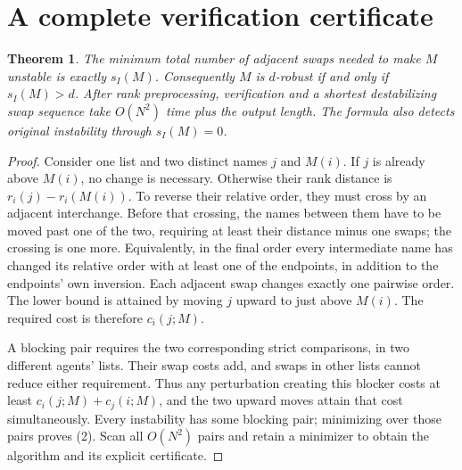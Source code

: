 \documentclass[11pt]{article}
\newtheorem{theorem}{Theorem}
\theoremstyle{definition}
\begin{document}
\section*{A complete verification certificate}
\begin{theorem}
The minimum total number of adjacent swaps needed to make $M$ unstable
is exactly $s_I(M)$. Consequently $M$ is $d$-robust if and only if
$s_I(M)>d$. After rank preprocessing, verification and a shortest
destabilizing swap sequence take $O(N^2)$ time plus the output length.
The formula also detects original instability through $s_I(M)=0$.
\end{theorem}
\begin{proof}
Consider one list and two distinct names $j$ and $M(i)$. If $j$ is already
above $M(i)$, no change is necessary. Otherwise their rank distance is
$r_i(j)-r_i(M(i))$. To reverse their relative order, they must cross by an
adjacent interchange. Before that crossing, the names between them have
to be moved past one of the two, requiring at least their distance minus
one swaps; the crossing is one more. Equivalently, in the final order
every intermediate name has changed its relative order with at least one
of the endpoints, in addition to the endpoints' own inversion. Each
adjacent swap changes exactly one pairwise order. The lower bound is
attained by moving $j$ upward to just above $M(i)$. The required cost is
therefore $c_i(j;M)$.

A blocking pair requires the two corresponding strict comparisons, in
two different agents' lists. Their swap costs add, and swaps in other
lists cannot reduce either requirement. Thus any perturbation creating
this blocker costs at least $c_i(j;M)+c_j(i;M)$, and the two upward moves
attain that cost simultaneously. Every instability has some blocking
pair; minimizing over those pairs proves (2). Scan all $O(N^2)$ pairs and
retain a minimizer to obtain the algorithm and its explicit certificate.
\end{proof}
\end{document}

